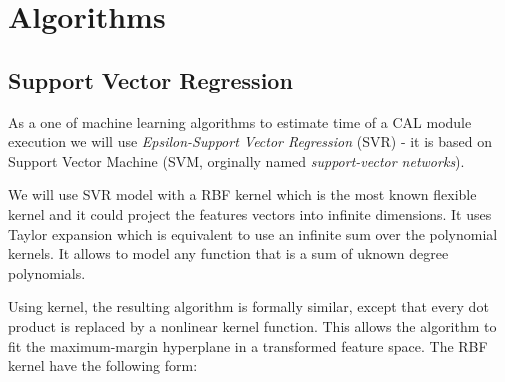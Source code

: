 \section{Algorithms}
\subsection{Support Vector Regression}

As a one of machine learning algorithms to estimate time of a CAL module execution we will use \textit{Epsilon-Support Vector Regression}\cite{svrc} (SVR) - it is based on Support Vector Machine (SVM, orginally named \textit{support-vector networks}\cite{svm}).

We will use SVR model with a RBF kernel\cite{rbf_kernel} which is the most known flexible kernel and it could project the features vectors into infinite dimensions. It uses Taylor expansion which is equivalent to use an infinite sum over the polynomial kernels. It allows to model any function that is a sum of uknown degree polynomials.

Using kernel, the resulting algorithm is formally similar, except that every dot product is replaced by a nonlinear kernel function. This allows the algorithm to fit the maximum-margin hyperplane in a transformed feature space. The RBF kernel have the following form:

